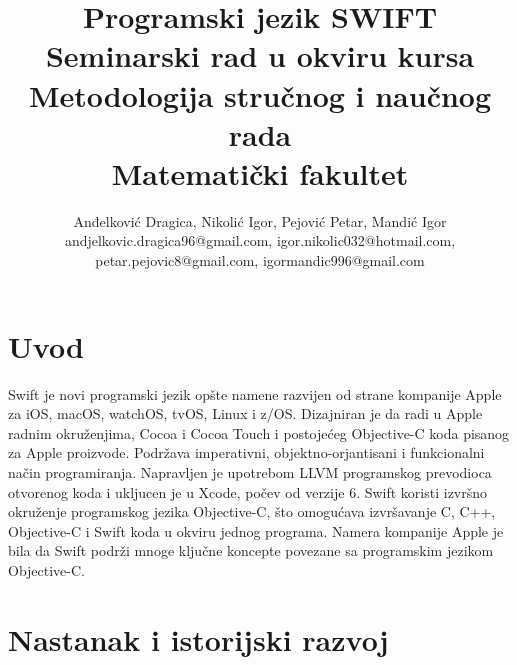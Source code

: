 \documentclass[a4paper]{article}
\begin{document}
\title{Programski jezik SWIFT\\ \small{Seminarski rad u okviru kursa\\Metodologija stručnog i naučnog rada\\ Matematički fakultet}}

\author{Anđelković Dragica, Nikolić Igor, Pejović Petar, Mandić Igor\\ andjelkovic.dragica96@gmail.com, igor.nikolic032@hotmail.com,\\ petar.pejovic8@gmail.com, igormandic996@gmail.com}


\maketitle



\tableofcontents

\newpage

\section{Uvod}
\label{sec:uvod}
Swift je novi programski jezik  opšte namene razvijen od strane kompanije Apple za iOS, macOS, watchOS, tvOS, Linux i z/OS. Dizajniran je da radi u Apple radnim okruženjima, Cocoa i Cocoa Touch i  postojećeg Objective-C koda pisanog za Apple proizvode. Podržava imperativni, objektno-orjantisani i funkcionalni način programiranja. Napravljen je upotrebom LLVM programskog prevodioca otvorenog koda i ukljucen je u Xcode, počev od verzije 6. Swift koristi izvršno okruženje programskog jezika Objective-C, što omogućava izvršavanje C, C++, Objective-C i Swift koda u okviru jednog programa.
Namera kompanije Apple je bila  da Swift podrži mnoge ključne koncepte povezane sa programskim jezikom Objective-C.




\section{Nastanak i istorijski razvoj}
\label{sec:prviDeo}
\end{document}
